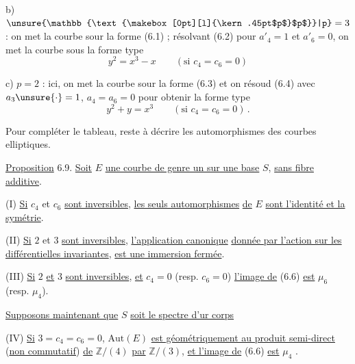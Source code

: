 b) $\unsure{\mathbb{\text{\makebox[0pt][l]{\kern.45pt$p$}$p$}}|p}=3$ : on met la courbe sour la forme (6.1) ; résolvant (6.2) pour $a'_4=1$ et $a'_6=0$, on met la courbe sous la forme type%
%
%
\[
y^2=x^3-x \qquad (\text{si }c_4=c_6=0) \tag*{(6.7)}
\]

c) $p=2$ : ici, on met la courbe sour la forme (6.3) et on résoud (6.4) avec $a_3\unsure{\cdot}=1$, $a_4=a_6=0$ pour obtenir la forme type
\[
y^2+y=x^3 \qquad (\text{si }c_4=c_6=0) \, . \tag*{(6.8)}
\]

Pour compléter le tableau, reste à décrire les automorphismes des courbes elliptiques.

\uline{Proposition} 6.9. \quad \uline{Soit} $E$ \uline{une courbe de genre un sur une base} $S$, \uline{sans fibre additive}.

(I) \quad \uline{Si} $c_4$ et $c_6$ \uline{sont inversibles,} \uline{les seuls automorphismes} \uline{de} $E$ \uline{sont l'identité et la symétrie}.

(II) \quad \uline{Si} $2$ et $3$ \uline{sont inversibles}, \uline{l'application canonique}
\uline{donnée par l'action sur les différentielles invariantes}, \uline{est une immersion fermée}.

(III) \uline{Si} $2$ \uline{et} $3$ \uline{sont inversibles}, \uline{et} $c_4=0$ (resp. $c_6=0$) \uline{l'image de} (6.6) \uline{est} $\mu_6$ (resp. $\mu_4$).

\uline{Supposons maintenant que} $S$ \uline{soit le spectre d'ur corps}

(IV) \quad \uline{Si} $3=c_4=c_6=0$, $\mathrm{Aut}(E)$ \uline{est géométriquement  au produit semi-direct} (\uline{non commutatif}) \uline{de} $\mathbb{Z}/(4)$ \uline{par} $\mathbb{Z}/(3)$, \uline{et l'image de} (6.6) \uline{est} $\mu_4$ .

